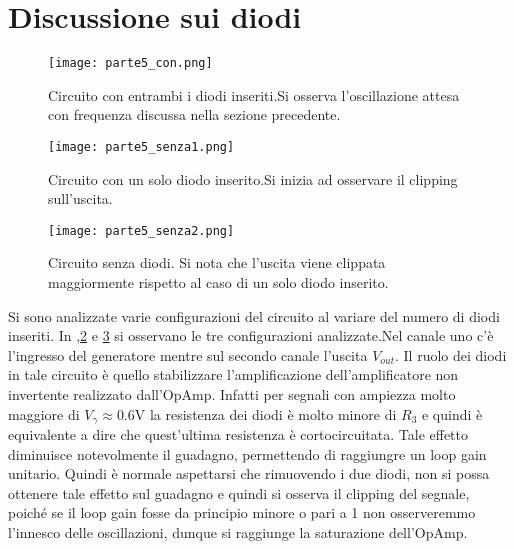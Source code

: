 \section{Discussione sui diodi}
\begin{figure}[h]
	\centering
	\texttt{[image: parte5\_con.png]}
	\caption{Circuito con entrambi i diodi inseriti.Si osserva l'oscillazione attesa con frequenza discussa nella sezione precedente.}
	\label{f:con_diodi}
\end{figure}

\begin{figure}[h]
	\centering
	\texttt{[image: parte5\_senza1.png]}
	\caption{Circuito con un solo diodo inserito.Si inizia ad osservare il clipping sull'uscita.}
	\label{f:senza_1diodo}
\end{figure}

\begin{figure}[h]
	\centering
	\texttt{[image: parte5\_senza2.png]}
	\caption{Circuito senza diodi. Si nota che l'uscita viene clippata maggiormente rispetto al caso di un solo diodo inserito.}
	\label{f:senza_2diodi}
\end{figure}
Si sono analizzate varie configurazioni del circuito al variare del numero di diodi inseriti. In ,\ref{f:senza_1diodo} e \ref{f:senza_2diodi} si osservano le tre configurazioni analizzate.Nel canale uno c'è l'ingresso del generatore mentre sul secondo canale l'uscita $V_{out}$.
Il ruolo dei diodi in tale circuito è quello stabilizzare l'amplificazione dell'amplificatore non invertente realizzato dall'OpAmp. Infatti per segnali con ampiezza molto maggiore di $V_\gamma \approx 0.6$V la resistenza dei diodi è molto minore di $R_3$ e quindi è equivalente a dire che quest'ultima resistenza è cortocircuitata. Tale effetto diminuisce notevolmente il guadagno, permettendo di raggiungre un loop gain unitario. Quindi è normale aspettarsi che rimuovendo i due diodi, non si possa ottenere tale effetto sul guadagno e quindi si osserva il clipping del segnale, poiché se il loop gain fosse da principio minore o pari a 1 non osserveremmo l'innesco delle oscillazioni, dunque si raggiunge la saturazione dell'OpAmp.
